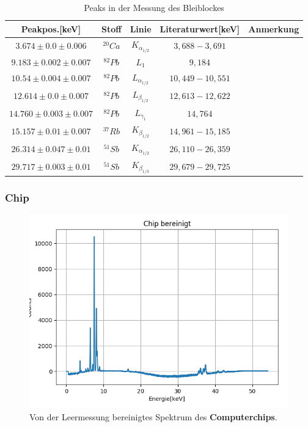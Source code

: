 \documentclass[12pt,a4paper]{article}
\begin{document}
\begin{table}[H]
\center
\begin{tabular}{|c|c|c|c|c|}
\hline 
Peakpos.[keV] & Stoff & Linie & Literaturwert[keV] & Anmerkung \\
\hline 
$3.674 \pm 0.0 \pm 0.006$& $^{20}Ca$ & $K_{\alpha_{1/2}}$ & $3,688-3,691$ & \\
\hline 
$9.183 \pm 0.002 \pm 0.007$ & $^{82}Pb$ & $L_{1}$ & $9,184$ & \\ 
\hline 
$10.54 \pm 0.004 \pm 0.007$ & $^{82}Pb$ & $L_{\alpha_{1/2}}$ & $10,449-10,551$ & \\
\hline
$12.614 \pm 0.0 \pm 0.007$ & $^{82}Pb$ & $L_{\beta_{1/2}}$ & $12,613-12,622$ & \\
\hline
$14.760 \pm 0.003 \pm 0.007$ & $^{82}Pb$ & $L_{\gamma_{1}}$ & $14,764$ & \\
\hline
$15.157 \pm 0.01 \pm 0.007$ & $^{37}Rb$ & $K_{\beta_{1/2}}$ & $14,961-15,185$ & \\
\hline
$26.314 \pm 0.047 \pm 0.01$ & $^{51}Sb$ & $K_{\alpha_{1/2}}$ & $26,110-26,359$ & \\
\hline
$29.717 \pm 0.003 \pm 0.01$ & $^{51}Sb$ & $K_{\beta_{1/3}}$ & $29,679-29,725$ & \\
\hline
\end{tabular} 
\caption{Peaks in der Messung des Bleiblockes}
\label{prop_blei}
\end{table}
\newpage
\subsubsection{Chip}
\begin{figure}[H]
\centering
\includegraphics[scale=1]{Bilder/roentgen_spektren/chip_0.png}
\caption{Von der Leermessung bereinigtes Spektrum des \textbf{Computerchips}.}
\label{fig:prop_chip}
\end{figure}
\end{document}
